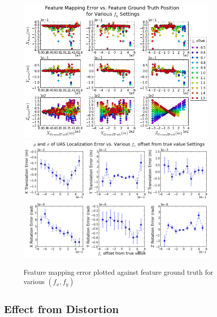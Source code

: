 \begin{figure}[h]
  \centering
  \includegraphics[width=10cm,keepaspectratio=true]{./Figures/SimulationFigures/Figure42.png}
  \includegraphics[width=10cm,keepaspectratio=true]{./Figures/SimulationFigures/Figure43.png}
  \caption{Feature mapping error plotted against feature ground truth
    for various $(f_x, f_y)$}
  \label{fig:simfig38-39}
\end{figure}

\subsection{Effect from Distortion}

